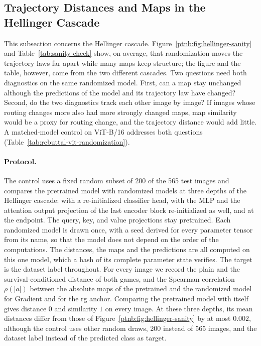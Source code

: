 \subsection{Trajectory Distances and Maps in the Hellinger Cascade}\label{ptnb:sec:per-image-orthogonality}

This subsection concerns the Hellinger cascade. Figure~\ref{ptnb:fig:hellinger-sanity} and Table~\ref{tab:sanity-check} show, on average, that randomization moves the trajectory laws far apart while many maps keep structure; the figure and the table, however, come from the two different cascades. Two questions need both diagnostics on the same randomized model. First, can a map stay unchanged although the predictions of the model and its trajectory law have changed? Second, do the two diagnostics track each other image by image? If images whose routing changes more also had more strongly changed maps, map similarity would be a proxy for routing change, and the trajectory distance would add little. A matched-model control on ViT-B/16 addresses both questions (Table~\ref{tab:rebuttal-vit-randomization}).

\paragraph{Protocol.}
The control uses a fixed random subset of 200 of the 565 test images and compares the pretrained model with randomized models at three depths of the Hellinger cascade: with a re-initialized classifier head, with the MLP and the attention output projection of the last encoder block re-initialized as well, and at the endpoint. The query, key, and value projections stay pretrained. Each randomized model is drawn once, with a seed derived for every parameter tensor from its name, so that the model does not depend on the order of the computations. The distances, the maps and the predictions are all computed on this one model, which a hash of its complete parameter state verifies. The target is the dataset label throughout. For every image we record the plain and the survival-conditioned distance of both games, and the Spearman correlation $\rho(|a|)$ between the absolute maps of the pretrained and the randomized model for Gradient and for the \ac{rg} anchor. Comparing the pretrained model with itself gives distance $0$ and similarity $1$ on every image. At these three depths, its mean distances differ from those of Figure~\ref{ptnb:fig:hellinger-sanity} by at most $0.002$, although the control uses other random draws, 200 instead of 565 images, and the dataset label instead of the predicted class as target.

